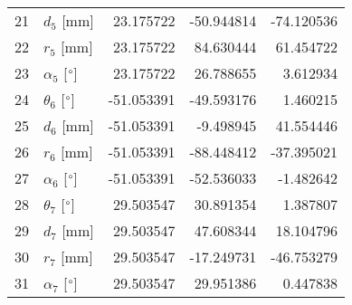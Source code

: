 \documentclass{standalone}%
\begin{document}
\begin{tabular}{llrrr}
21 &              $d_{5}$ [mm] &  23.175722 &  -50.944814 &  -74.120536 \\
22 &              $r_{5}$ [mm] &  23.175722 &   84.630444 &   61.454722 \\
23 &  $\alpha_{5}$ [$\degree$] &  23.175722 &   26.788655 &    3.612934 \\
24 &  $\theta_{6}$ [$\degree$] & -51.053391 &  -49.593176 &    1.460215 \\
25 &              $d_{6}$ [mm] & -51.053391 &   -9.498945 &   41.554446 \\
26 &              $r_{6}$ [mm] & -51.053391 &  -88.448412 &  -37.395021 \\
27 &  $\alpha_{6}$ [$\degree$] & -51.053391 &  -52.536033 &   -1.482642 \\
28 &  $\theta_{7}$ [$\degree$] &  29.503547 &   30.891354 &    1.387807 \\
29 &              $d_{7}$ [mm] &  29.503547 &   47.608344 &   18.104796 \\
30 &              $r_{7}$ [mm] &  29.503547 &  -17.249731 &  -46.753279 \\
31 &  $\alpha_{7}$ [$\degree$] &  29.503547 &   29.951386 &    0.447838 \\
\bottomrule
\end{tabular}
%
\end{document}
